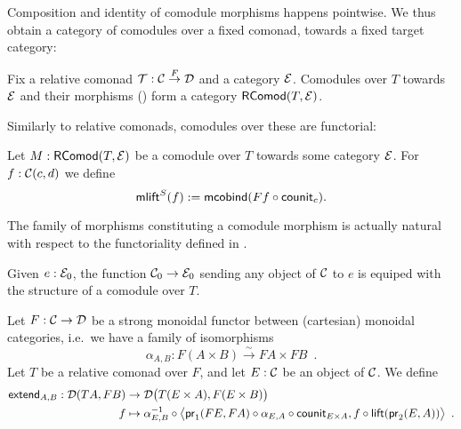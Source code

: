 \documentclass{amsart}
\begin{document}
Composition and identity of comodule morphisms happens pointwise. We thus obtain a category of comodules
over a fixed comonad, towards a fixed target category:

\begin{remark}
 Fix a relative comonad $\T : \C\stackrel{F}{\to}\D$ and a category $\E$.
 Comodules over $T$ towards $\E$ and their morphisms () form a category $\RComod(T,\E)$.
\end{remark}

Similarly to relative comonads, comodules over these are functorial:

\begin{definition}\label{def:comodule_lift}
 Let $M : \RComod(T,\E)$ be a comodule over $T$ towards some category $\E$. For $f : \C(c,d)$ we define
  \[ \mlift^S(f) := \mcobind(\comp{\counit_c}{Ff}) .  \]
\end{definition}


\begin{remark}
  The family of morphisms constituting a comodule morphism is actually natural with respect to the functoriality 
  defined in .
\end{remark}


\begin{definition}
  Given $e:\E_0$, the function $\C_0\to\E_0$ sending any object of $\C$ to $e$ is equiped with
  the structure of a comodule over $T$.
\end{definition}






\begin{definition}\label{def:extend}
 Let $F : \C\to \D$ be a strong monoidal functor between (cartesian) monoidal categories, 
 i.e.\ we have a family of isomorphisms
  \[ \alpha_{A,B} : F(A\times B) \stackrel{\sim}{\to} FA\times FB\enspace . \] 
  Let $T$ be a relative comonad over $F$, and let $E : \C$ be an object of $\C$.
 We define
 \begin{align*} \extend_{A,B} : \D(TA,FB) &\to \D\bigl(T(E\times A),F(E\times B)\bigr)\\
                                   f   &\mapsto \comp{\bigl\langle \comp{\counit_{E\times A}}{\comp{\alpha_{E,A}}{\pr_1(FE,FA)}}, \comp{\lift(\pr_2(E,A))}{f} \bigr\rangle}{\alpha_{E,B}^{-1}} \enspace .
\end{align*}



\end{definition}
\end{document}

